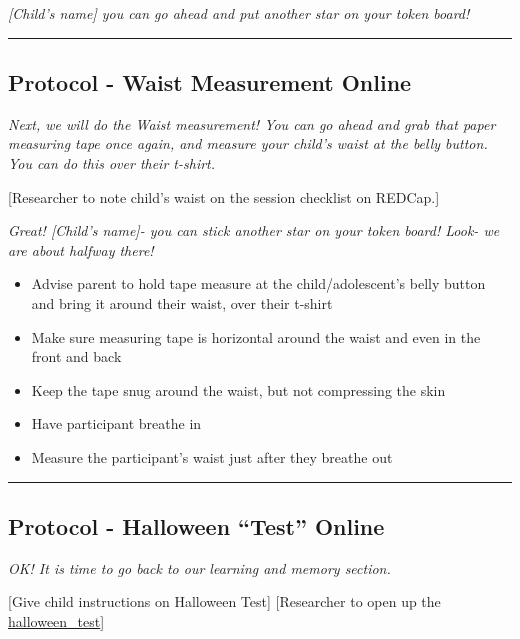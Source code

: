 \documentclass[]{book}
\begin{document}
\emph{{[}Child's name{]} you can go ahead and put another star on your token board!}

\begin{center}\rule{0.5\linewidth}{0.5pt}\end{center}

\hypertarget{protocol---waist-measurement-online-1}{%
\subsection{Protocol - Waist Measurement Online}\label{protocol---waist-measurement-online-1}}

\emph{Next, we will do the Waist measurement! You can go ahead and grab that paper measuring tape once again, and measure your child's waist at the belly button. You can do this over their t-shirt.}

{[}Researcher to note child's waist on the session checklist on REDCap.{]}

\emph{Great! {[}Child's name{]}- you can stick another star on your token board! Look- we are about halfway there!}

\begin{itemize}
\item
  Advise parent to hold tape measure at the child/adolescent's belly button and bring it around their waist, over their t-shirt
\item
  Make sure measuring tape is horizontal around the waist and even in the front and back
\item
  Keep the tape snug around the waist, but not compressing the skin
\item
  Have participant breathe in
\item
  Measure the participant's waist just after they breathe out
\end{itemize}

\begin{center}\rule{0.5\linewidth}{0.5pt}\end{center}

\hypertarget{protocol---halloween-test-online-1}{%
\subsection{Protocol - Halloween ``Test'' Online}\label{protocol---halloween-test-online-1}}

\emph{OK! It is time to go back to our learning and memory section.}

{[}Give child instructions on Halloween Test{]} {[}Researcher to open up the \href{https://ucla.app.box.com/file/709479264913}{halloween\_test}{]}
\end{document}
